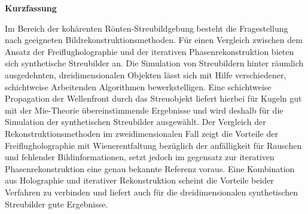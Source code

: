 	\begin{Huge}
		\textbf{Kurzfassung}\vspace{12mm}
	\end{Huge}
	
	Im Bereich der kohärenten Rönten-Streubildgebung besteht die Fragestellung nach geeigneten Bildrekonstruktionsmethoden. Für einen Vergleich zwischen dem Ansatz der Freiflugholographie und der iterativen Phasenrekonstruktion bieten sich synthetische Streubilder an. Die Simulation von Streubildern hinter räumlich ausgedehnten, dreidimensionalen Objekten lässt sich mit Hilfe verschiedener, schichtweise Arbeitenden Algorithmen bewerkstelligen. Eine schichtweise Propagation der Wellenfront durch das Streuobjekt liefert hierbei für Kugeln gut mit der Mie-Theorie übereinstimmende Ergebnisse und wird deshalb für die Simulation der synthetischen Streubilder ausgewählt. Der Vergleich der Rekonstruktionsmethoden im zweidimensionalen Fall zeigt die Vorteile der Freiflugholographie mit Wienerentfaltung bezüglich der anfälligkeit für Rauschen und fehlender Bildinformationen, setzt jedoch im gegensatz zur iterativen Phasenrekonstruktion eine genau bekannte Referenz voraus. Eine Kombination aus Holographie und iterativer Rekonstruktion scheint die Vorteile beider Verfahren zu verbinden und liefert auch für die dreidimensionalen synthetischen Streubilder gute Ergebnisse.
